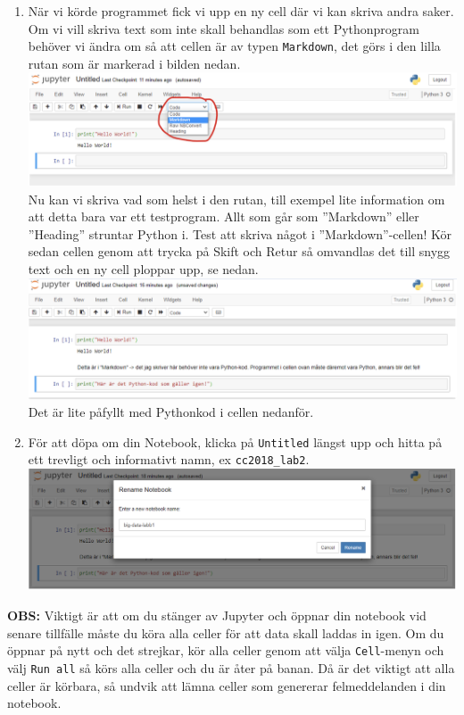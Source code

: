 \documentclass{article}
\begin{document}
\begin{enumerate}
\item När vi körde programmet fick vi upp en ny cell där vi kan skriva andra saker. Om vi vill skriva text som inte skall behandlas som ett Pythonprogram behöver vi ändra om så att cellen är av typen \verb+Markdown+, det görs i den lilla rutan som är markerad i bilden nedan.	\\
  \includegraphics[width=\textwidth]{figures/anaconda5.png}\\
Nu kan vi skriva vad som helst i den rutan, till exempel lite information om att detta bara var ett testprogram. Allt som går som ”Markdown” eller ”Heading” struntar Python i. Test att skriva något i ”Markdown”-cellen! Kör sedan cellen genom att trycka på Skift och Retur så omvandlas det till snygg text och en ny cell ploppar upp, se nedan.
  \includegraphics[width=\textwidth]{figures/anaconda6.png}\\
Det är lite påfyllt med Pythonkod i cellen nedanför.
\item För att döpa om din Notebook, klicka på \verb+Untitled+ längst upp och hitta på ett trevligt och informativt namn, ex \verb+cc2018_lab2+.\\
  \includegraphics[width=\textwidth]{figures/anaconda7.png}\\
  \end{enumerate}

\textbf{OBS:} Viktigt är att om du stänger av Jupyter och öppnar din notebook vid senare tillfälle måste du köra alla celler för att data skall laddas in igen. Om du öppnar på nytt och det strejkar, kör alla celler genom att välja \verb+Cell+-menyn och välj \verb+Run all+ så körs alla celler och du är åter på banan. Då är det viktigt att alla celler är körbara, så undvik att lämna celler som genererar felmeddelanden i din notebook.
\end{document}
